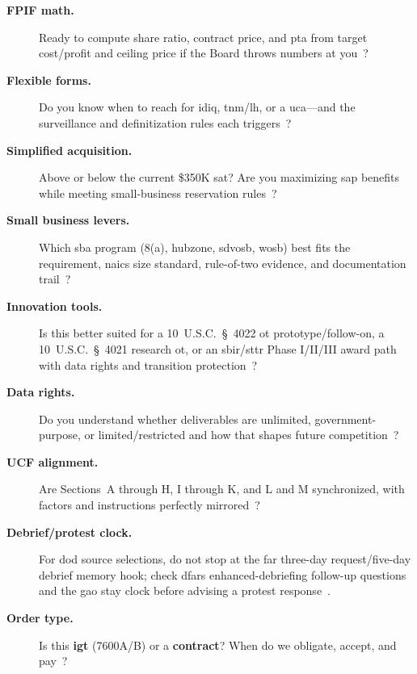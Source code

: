 \documentclass[../main.tex]{subfiles}
\begin{document}
\begin{description}
  \item[\textbf{FPIF math.}] Ready to compute share ratio, contract price, and \ac{pta} from target cost/profit and ceiling price if the Board throws numbers at you~\autocite{FAR-16-403-1-FPIF,NAVSEA-Contracts-Handbook-2023}?
  \item[\textbf{Flexible forms.}] Do you know when to reach for \ac{idiq}, \ac{tnm}/\ac{lh}, or a \ac{uca}---and the surveillance and definitization rules each triggers~\autocite{FAR-16-504-IDIQ,FAR-16-601-Time-Materials,FAR-16-602-Labor-Hour,FAR-16-603-1-Letter-Contracts,NMCARS,DFARS}?
  \item[\textbf{Simplified acquisition.}] Above or below the current \$350K \ac{sat}? Are you maximizing \ac{sap} benefits while meeting small-business reservation rules~\autocite{FAR-19-502-2-Set-Asides,AcquisitionGov-Threshold-Changes-2025}?
  \item[\textbf{Small business levers.}] Which \ac{sba} program (8(a), \ac{hubzone}, \ac{sdvosb}, \ac{wosb}) best fits the requirement, \ac{naics} size standard, rule-of-two evidence, and documentation trail~\autocite{FAR-19-102-Size-Standards,FAR-19-502-2-Set-Asides,SBA-Size-Standards-2026}?
  \item[\textbf{Innovation tools.}] Is this better suited for a 10~U.S.C.\ \S~4022 \ac{ot} prototype/follow-on, a 10~U.S.C.\ \S~4021 research \ac{ot}, or an \ac{sbir}/\ac{sttr} Phase I/II/III award path with data rights and transition protection~\autocite{USC-4021-OTA,USC-4022-OTF,USC-638-SBIR,SBIR-Apply-2026}?
  \item[\textbf{Data rights.}] Do you understand whether deliverables are unlimited, government-purpose, or limited/restricted and how that shapes future competition~\autocite{DFARS-227-7103-5-Technical-Data-Rights,DFARS-Subpart-227-72-Software-Rights}?
  \item[\textbf{UCF alignment.}] Are Sections~A through H, I through K, and L and M synchronized, with factors and instructions perfectly mirrored~\autocite{FAR-15-304-Evaluation-Factors,NAVSEA-Source-Selection-Guide-2022}?
  \item[\textbf{Debrief/protest clock.}] For \ac{dod} source selections, do not stop at the \ac{far} three-day request/five-day debrief memory hook; check \ac{dfars} enhanced-debriefing follow-up questions and the \ac{gao} stay clock before advising a protest response~\autocite{FAR-15-506-Postaward-Debriefing,DFARS-215-506-Postaward-Debriefing,DFARS-215-506-70-Followup-Questions,FAR-33-104-GAO-Protests,DFARS-233-104-GAO-Protests}.
  \item[\textbf{Order type.}] Is this \textbf{\ac{igt}} (7600A/B) or a \textbf{contract}? When do we obligate, accept, and pay~\autocite{DoDFMR-Vol3-Ch8,DoDFMR-Vol11A-Ch2,DoDFMR-Vol11A-Ch3,Treasury-GInvoicing}?

\end{description}
\end{document}

